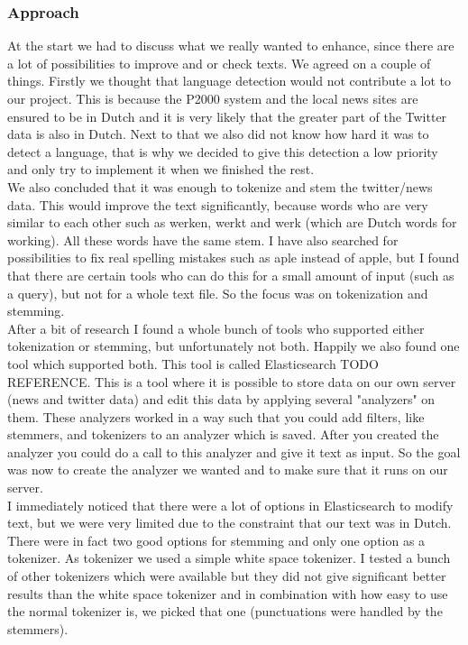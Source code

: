 \subsubsection*{Approach}
At the start we had to discuss what we really wanted to enhance, since there are a lot of possibilities to improve and or check texts. We agreed on a couple of things. Firstly we thought that language detection would not contribute a lot to our project. This is because the P2000 system and the local news sites are ensured to be in Dutch and it is very likely that the greater part of the Twitter data is also in Dutch. Next to that we also did not know how hard it was to detect a language, that is why we decided to give this detection a low priority and only try to implement it when we finished the rest. \\
We also concluded that it was enough to tokenize and stem the twitter/news data. This would improve the text significantly, because words who are very similar to each other such as werken, werkt and werk (which are Dutch words for working). All these words have the same stem. I have also searched for possibilities to fix real spelling mistakes such as aple instead of apple, but I found that there are certain tools who can do this for a small amount of input (such as a query), but not for a whole text file. So the focus was on tokenization and stemming.\\
After a bit of research I found a whole bunch of tools who supported either tokenization or stemming, but unfortunately not both. Happily we also found one tool which supported both. This tool is called Elasticsearch TODO REFERENCE. This is a tool where it is possible to store data on our own server (news and twitter data) and edit this data by applying several "analyzers" on them. These analyzers worked in a way such that you could add filters, like stemmers, and tokenizers to an analyzer which is saved. After you created the analyzer you could do a call to this analyzer and give it text as input. So the goal was now to create the analyzer we wanted and to make sure that it runs on our server. \\
I immediately noticed that there were a lot of options in Elasticsearch to modify text, but we were very limited due to the constraint that our text was in Dutch. There were in fact two good options for stemming and only one option as a tokenizer. As tokenizer we used a simple white space tokenizer. I tested a bunch of other tokenizers which were available but they did not give significant better results than the white space tokenizer and in combination with how easy to use the normal tokenizer is, we picked that one (punctuations were handled by the stemmers). \\
